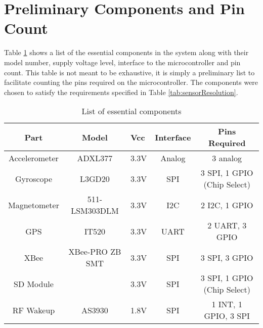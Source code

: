 \section{Preliminary Components and Pin Count}

Table \ref{tab:componentPinCount} shows a list of the essential components in the system along with their model number, supply voltage level, interface to the microcontroller and pin count.  This table is not meant to be exhaustive, it is simply a preliminary list to facilitate counting the pins required on the microcontroller. The components were chosen to satisfy the requirements specified in Table \ref{tab:sensorResolution}.

\begin{table}[htbp]
  \centering
  \caption{List of essential components}
    \begin{tabular}{|c|c|m{0.35in}|c|c|}
    \hline
    Part  & Model & \centering Vcc & Interface & Pins Required \\
    \hline \hline
    Accelerometer & ADXL377 & \centering 3.3V  & Analog & 3 analog \\ \hline
    Gyroscope & L3GD20 & \centering 3.3V  & SPI   & 3 SPI, 1 GPIO (Chip Select) \\ \hline
    Magnetometer & 511-LSM303DLM & \centering 3.3V  & I2C   & 2 I2C, 1 GPIO \\ \hline
    GPS   & IT520 & \centering 3.3V   & UART  & 2 UART, 3 GPIO \\ \hline 
    XBee  & XBee-PRO ZB SMT &\centering 3.3V  & SPI   & 3 SPI, 3 GPIO \\ \hline
    SD Module &       & \centering 3.3V  & SPI   & 3 SPI, 1 GPIO (Chip Select) \\ \hline
    RF Wakeup & AS3930 & \centering 1.8V  & SPI   & 1 INT, 1 GPIO, 3 SPI \\ \hline
    
    \end{tabular}%
  \label{tab:componentPinCount}%
\end{table}%
